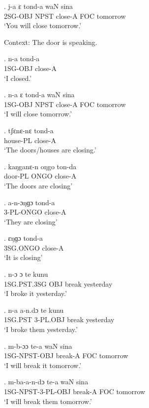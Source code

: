 \documentclass{assets/fieldnotes}
\begin{document}
\exg.
j-a    ɛ     tond-a    waN   sina     \\
2SG-OBJ NPST close-A   FOC   tomorrow \\%
`You will close tomorrow.'

Context: The door is speaking.

\exg.
n-a    tond-a  \\
1SG-OBJ   close-A \\%
`I closed.'

\exg.
n-a    ɛ     tond-a    waN   sina     \\
1SG-OBJ   NPST   close-A   FOC   tomorrow \\%
`I will close tomorrow.'

\exg.
tʃɛnɛ-nɛ   tond-a  \\
house-PL   close-A \\%
`The doors/houses are closing.'

\exg.
kaŋganɛ-n oŋgo   ton-da  \\
door-PL     ONGO    close-A \\%
`The doors are closing'

\exg.
a-n-ɔŋɡɔ    tond-a  \\
3-PL-ONGO   close-A \\%
`They are closing'

\exg.
ɛŋɡɔ       tond-a  \\
3SG.ONGO   close-A \\%
`It is closing'

\exg.
n-ɔ        ɔ     te      kunu      \\
1SG.PST.3SG   OBJ   break   yesterday \\%
`I broke it yesterday.' \label{I broke it yesterday}


\exg.
n-a    a-n.dɔ     te      kunu      \\
1SG.PST  3-PL.OBJ   break   yesterday \\%
`I broke them yesterday.'

\exg.
m-b-ɔɔ              te-a      waN   sina     \\
1SG-NPST-OBJ   break-A   FOC   tomorrow \\%
`I will break it tomorrow.'

\exg.
m-ba-a-n-dɔ           te-a      waN   sina     \\
1SG-NPST-3-PL-OBJ   break-A   FOC   tomorrow \\%
`I will break them tomorrow.'
\end{document}
